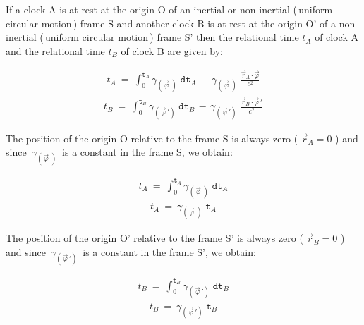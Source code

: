 \documentclass[10pt,fleqn]{article}
\begin{document}
\noindent If a clock A is at rest at the origin O of an inertial or non-inertial (\,uniform circular motion\,) frame S and another clock B is at rest at the origin O' of a non-inertial (\,uniform circular motion\,) frame S' then the relational time $t_{A}$ of clock A and the relational time $t_{B}$ of clock B are given by:
\par \vspace{-0.66em}
\begin{eqnarray*}
t_{A} ~=~ \int_0^{\mathtt{t}_A} \gamma_{(\,\vec\varphi\;)} \; \mathtt{dt}_{A} \, - \, \gamma_{(\,\vec\varphi\;)} \; \frac{\vec{r}_{A} \cdot \vec{\varphi}}{c^2}
\end{eqnarray*}
\begin{eqnarray*}
t_{B} ~=~ \int_0^{\mathtt{t}_B} \gamma_{(\,\vec\varphi\,')} \; \mathtt{dt}_{B} \, - \, \gamma_{(\,\vec\varphi\,')} \; \frac{\vec{r}_{B} \cdot \vec{\varphi}{\,'}}{c^2}
\end{eqnarray*}
\par \vspace{+0.81em}
\noindent The position of the origin O relative to the frame S is always zero {\small ( $\vec{r}_{A} = 0$ )} and since $\,\gamma_{(\,\vec\varphi\;)}\,$ is a constant in the frame S, we obtain:
\par \vspace{-0.66em}
\begin{eqnarray*}
t_{A} ~=~ \int_0^{\mathtt{t}_A} \gamma_{(\,\vec\varphi\;)} \; \mathtt{dt}_{A}
\end{eqnarray*}
\begin{eqnarray*}
t_{A} ~=~ \gamma_{(\,\vec\varphi\;)} \; \mathtt{t}_{A}
\end{eqnarray*}
\par \vspace{+0.81em}
\noindent The position of the origin O' relative to the frame S' is always zero {\small ( $\vec{r}_{B} = 0$ )} and since $\,\gamma_{(\,\vec\varphi\,')}\,$ is a constant in the frame S', we obtain:
\par \vspace{-0.66em}
\begin{eqnarray*}
t_{B} ~=~ \int_0^{\mathtt{t}_B} \gamma_{(\,\vec\varphi\,')} \; \mathtt{dt}_{B}
\end{eqnarray*}
\begin{eqnarray*}
t_{B} ~=~ \gamma_{(\,\vec\varphi\,')} \; \mathtt{t}_{B}
\end{eqnarray*}
\par \vspace{+0.81em}
\end{document}
